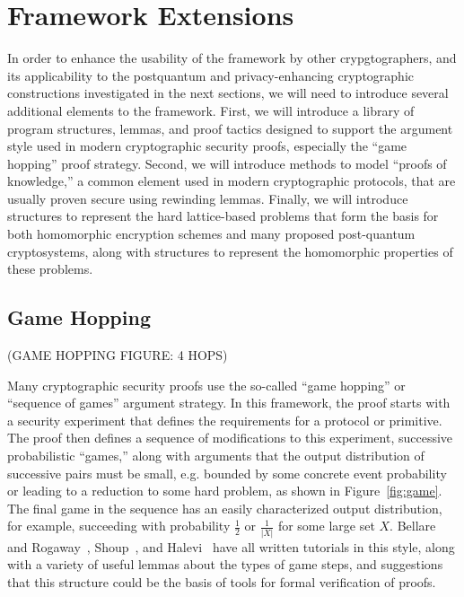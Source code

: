 \section{Framework Extensions}

In order to enhance the usability of the \vcvio framework by other crypgtographers, and its applicability to the postquantum and privacy-enhancing cryptographic constructions investigated in the next sections, we will need to introduce several additional elements to the framework.
First, we will introduce a library of program structures, lemmas, and proof tactics designed to support the argument style used in modern cryptographic security proofs, especially the ``game hopping'' proof strategy.
Second, we will introduce methods to model ``proofs of knowledge,'' a common element used in modern cryptographic protocols, that are usually proven secure using rewinding lemmas.
Finally, we will introduce \vcvio structures to represent the hard lattice-based problems that form the basis for both homomorphic encryption schemes and many proposed post-quantum cryptosystems, along with structures to represent the homomorphic properties of these problems.

\subsection{Game Hopping} \label{sec:games}

(GAME HOPPING FIGURE: 4 HOPS)

Many cryptographic security proofs use the so-called ``game hopping'' or ``sequence of games'' argument strategy.
In this framework, the proof starts with a security experiment that defines the requirements for a protocol or primitive.
The proof then defines a sequence of modifications to this experiment, successive probabilistic ``games,'' along with arguments that the output distribution of successive pairs must be small, e.g. bounded by some concrete event probability or leading to a reduction to some hard problem, as shown in Figure~\ref{fig:game}.
The final game in the sequence has an easily characterized output distribution, for example, succeeding with probability $\frac{1}{2}$ or $\frac{1}{|X|}$ for some large set $X$.
Bellare and Rogaway~\cite{bellare2006security}, Shoup~\cite{shoup2004sequences}, and Halevi~\cite{halevi2005plausible} have all written tutorials in this style, along with a variety of useful lemmas about the types of game steps, and suggestions that this structure could be the basis of tools for formal verification of proofs.

